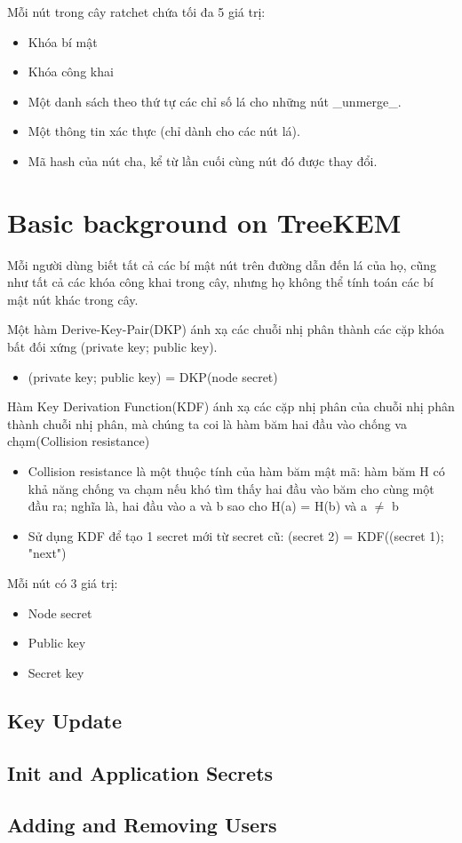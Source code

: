\documentclass[../main-report.tex]{subfiles}
\begin{document}
Mỗi nút trong cây ratchet chứa tối đa 5 giá trị:

\begin{itemize}
\item{Khóa bí mật}
\item{Khóa công khai}
\item{Một danh sách theo thứ tự các chỉ số lá cho những nút \_unmerge\_.}
\item{Một thông tin xác thực (chỉ dành cho các nút lá).}
\item{Mã hash của nút cha, kể từ lần cuối cùng nút đó được thay đổi.}
\end{itemize}

\section{Basic background on TreeKEM}
Mỗi người dùng biết tất cả các bí mật nút trên đường dẫn đến lá của họ, cũng như tất cả các khóa công khai trong cây, nhưng họ không thể tính toán các bí mật nút khác trong cây.

Một hàm Derive-Key-Pair(DKP) ánh xạ các chuỗi nhị phân thành các cặp khóa bất đối xứng (private key; public key).

\begin{itemize}
\item{(private key; public key) = DKP(node secret)}
\end{itemize}

Hàm Key Derivation Function(KDF) ánh xạ các cặp nhị phân của chuỗi nhị phân thành chuỗi nhị phân, mà chúng ta coi là hàm băm hai đầu vào chống va chạm(Collision resistance)

\begin{itemize}
\item{Collision resistance là một thuộc tính của hàm băm mật mã: hàm băm H có khả năng chống va chạm nếu khó tìm thấy hai đầu vào băm cho cùng một đầu ra; nghĩa là, hai đầu vào a và b sao cho H(a) = H(b) và a $\neq$ b}
\item{Sử dụng KDF để tạo 1 secret mới từ secret cũ: (secret 2) = KDF((secret 1); "next")}
\end{itemize}

Mỗi nút có 3 giá trị:

\begin{itemize}
\item{Node secret}
\item{Public key}
\item{Secret key}
\end{itemize}

\subsection{Key Update}




\subsection{Init and Application Secrets}

\subsection{Adding and Removing Users}
\end{document}
